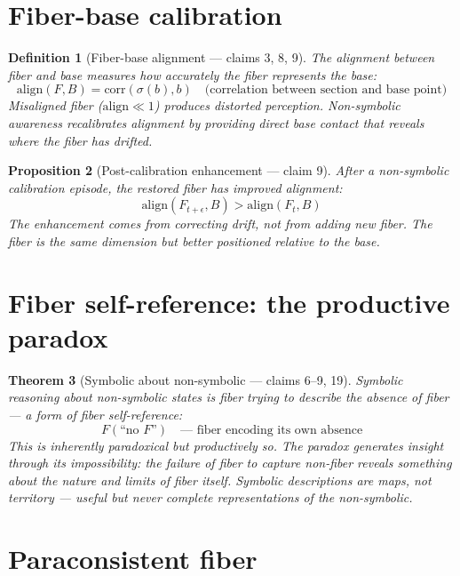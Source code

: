 \documentclass[11pt,a4paper]{article}
\newtheorem{definition}{Definition}[section]
\newtheorem{theorem}[definition]{Theorem}
\newtheorem{proposition}[definition]{Proposition}
\begin{document}
\section{Fiber-base calibration}

\begin{definition}[Fiber-base alignment --- claims 3, 8, 9]
The \emph{alignment} between fiber and base measures how accurately the
fiber represents the base:
\[
  \text{align}(F, B) = \text{corr}(\sigma(b), b) \quad
  \text{(correlation between section and base point)}
\]
Misaligned fiber ($\text{align} \ll 1$) produces distorted perception.
Non-symbolic awareness recalibrates alignment by providing direct base
contact that reveals where the fiber has drifted.
\end{definition}

\begin{proposition}[Post-calibration enhancement --- claim 9]
\label{prop:enhance}
After a non-symbolic calibration episode, the restored fiber has
improved alignment:
\[
  \text{align}(F_{t+\epsilon}, B) > \text{align}(F_t, B)
\]
The enhancement comes from correcting drift, not from adding new fiber.
The fiber is the same dimension but better positioned relative to the
base.
\end{proposition}


\section{Fiber self-reference: the productive paradox}

\begin{theorem}[Symbolic about non-symbolic --- claims 6--9, 19]
Symbolic reasoning about non-symbolic states is fiber trying to describe
the absence of fiber --- a form of fiber self-reference:
\[
  F(\text{``no } F \text{''}) \quad \text{--- fiber encoding its own absence}
\]
This is inherently paradoxical but productively so. The paradox generates
insight through its impossibility: the failure of fiber to capture
non-fiber reveals something about the nature and limits of fiber itself.
Symbolic descriptions are maps, not territory --- useful but never
complete representations of the non-symbolic.
\end{theorem}

\section{Paraconsistent fiber}
\end{document}
